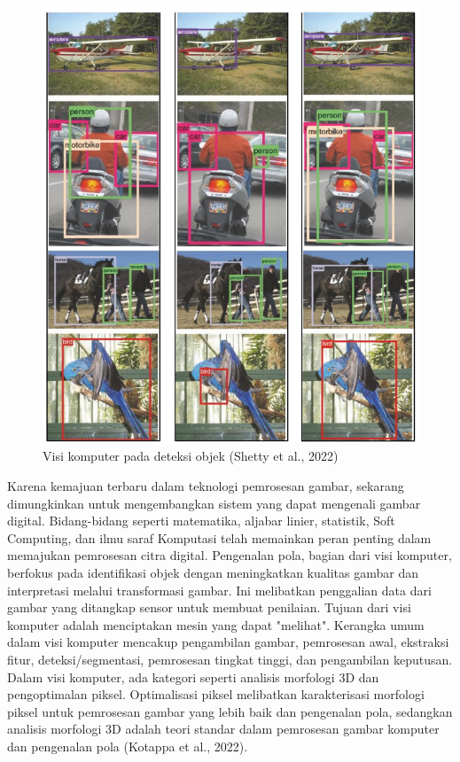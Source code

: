 \begin{figure}[H]
  \centering
  \includegraphics[scale=0.55]{gambar/computervision.png}
  \caption{Visi komputer pada deteksi objek (Shetty et al., 2022)}
  \label{fig:visikomdeteksi}
\end{figure}

Karena kemajuan terbaru dalam teknologi pemrosesan gambar, sekarang dimungkinkan untuk mengembangkan sistem yang dapat mengenali gambar digital. Bidang-bidang seperti matematika, aljabar linier, statistik, Soft Computing, dan ilmu saraf Komputasi telah memainkan peran penting dalam memajukan pemrosesan citra digital. Pengenalan pola, bagian dari visi komputer, berfokus pada identifikasi objek dengan meningkatkan kualitas gambar dan interpretasi melalui transformasi gambar. Ini melibatkan penggalian data dari gambar yang ditangkap sensor untuk membuat penilaian. Tujuan dari visi komputer adalah menciptakan mesin yang dapat "melihat". Kerangka umum dalam visi komputer mencakup pengambilan gambar, pemrosesan awal, ekstraksi fitur, deteksi/segmentasi, pemrosesan tingkat tinggi, dan pengambilan keputusan. Dalam visi komputer, ada kategori seperti analisis morfologi 3D dan pengoptimalan piksel. Optimalisasi piksel melibatkan karakterisasi morfologi piksel untuk pemrosesan gambar yang lebih baik dan pengenalan pola, sedangkan analisis morfologi 3D adalah teori standar dalam pemrosesan gambar komputer dan pengenalan pola (Kotappa  et al., 2022).

